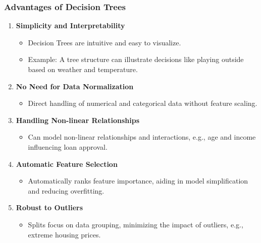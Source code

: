 \documentclass[aspectratio=169]{beamer}
\begin{document}
\begin{frame}[fragile]
    \frametitle{Advantages of Decision Trees}
    \begin{enumerate}
        \item \textbf{Simplicity and Interpretability}
        \begin{itemize}
            \item Decision Trees are intuitive and easy to visualize.
            \item Example: A tree structure can illustrate decisions like playing outside based on weather and temperature.
        \end{itemize}

        \item \textbf{No Need for Data Normalization}
        \begin{itemize}
            \item Direct handling of numerical and categorical data without feature scaling.
        \end{itemize}
        
        \item \textbf{Handling Non-linear Relationships}
        \begin{itemize}
            \item Can model non-linear relationships and interactions, e.g., age and income influencing loan approval.
        \end{itemize}
        
        \item \textbf{Automatic Feature Selection}
        \begin{itemize}
            \item Automatically ranks feature importance, aiding in model simplification and reducing overfitting.
        \end{itemize}
        
        \item \textbf{Robust to Outliers}
        \begin{itemize}
            \item Splits focus on data grouping, minimizing the impact of outliers, e.g., extreme housing prices.
        \end{itemize}
    \end{enumerate}
\end{frame}
\end{document}

